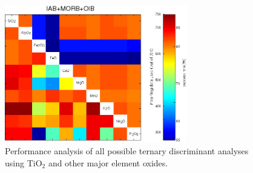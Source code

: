 \begin{figure}[htbp]
  \includegraphics[width=300]{figures/xPlotMajor3Ti_linear_err.jpg}
  \caption[Performance  analysis of  all possible  ternary  discriminant analyses
 using TiO$_2$ and other major element oxides]
{Performance  analysis of  all possible  ternary  discriminant analyses
 using TiO$_2$ and other major element oxides.}
  \label{fig:major3lin}
\end{figure}

